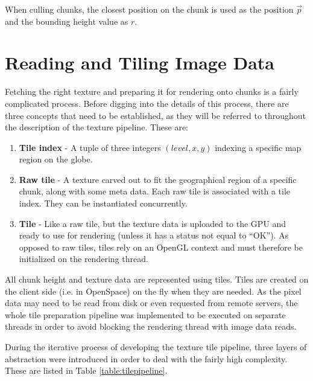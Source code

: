 When culling chunks, the closest position on the chunk is used as the position $\vec{p}$ and the bounding height value as $r$.

\section{Reading and Tiling Image Data}
Fetching the right texture and preparing it for rendering onto chunks is a fairly complicated process. Before digging into the details of this process, there are three concepts that need to be established, as they will be referred to throughout the description of the texture pipeline. These are:

\begin{enumerate}
	\item \textbf{Tile index} - A tuple of three integers $(level, x, y)$ indexing a specific map region on the globe.
	\item \textbf{Raw tile} - A texture carved out to fit the geographical region of a specific chunk, along with some meta data. Each raw tile is associated with a tile index. They can be instantiated concurrently.
	\item \textbf{Tile} - Like a raw tile, but the texture data is uploaded to the GPU and ready to use for rendering (unless it has a status not equal to ``OK''). As opposed to raw tiles, tiles rely on an OpenGL context and must therefore be initialized on the rendering thread.
\end{enumerate}

All chunk height and texture data are represented using tiles. Tiles are created on the client side (i.e. in OpenSpace) on the fly when they are needed. As the pixel data may need to be read from disk or even requested from remote servers, the whole tile preparation pipeline was implemented to be executed on separate threads in order to avoid blocking the rendering thread with image data reads. 

During the iterative process of developing the texture tile pipeline, three layers of abstraction were introduced in order to deal with the fairly high complexity. These are listed in Table \ref{table:tilepipeline}.

\begin{center}
  \begin{table}
  \caption[]{Abstraction layers used in the texture data pipeline}
    \label{table:tilepipeline}
  \end{table}
\end{center}

